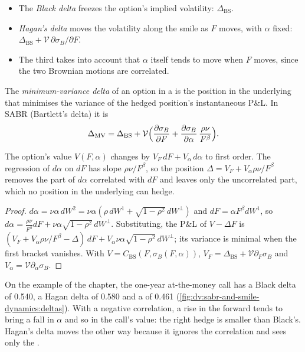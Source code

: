 \begin{itemize}
\item The \emph{Black delta} freezes the option's implied volatility: $\Delta_{\mathrm{BS}}$.
\item \emph{Hagan's delta} moves the volatility along the smile as $F$ moves, with $\alpha$ fixed:
$\Delta_{\mathrm{BS}}+\mathcal V\,\partial\sigma_B/\partial F$.
\item The third takes into account that $\alpha$ itself tends to move when $F$ moves, since the two
Brownian motions are correlated.
\end{itemize}

\begin{definition}\label{def:dv:sabr-and-smile-dynamics:mvdelta}
The \emph{minimum-variance delta} of an option in a 
is the position in the underlying that minimises the variance of the hedged position's instantaneous P\&L.
In SABR (Bartlett's delta) it is
\[
\Delta_{\mathrm{MV}}=\Delta_{\mathrm{BS}}+\mathcal V\Bigl(\frac{\partial\sigma_B}{\partial F}
+\frac{\partial\sigma_B}{\partial\alpha}\,\frac{\rho\nu}{F^{\beta}}\Bigr).
\]
\end{definition}

\begin{proposition}\label{prop:dv:sabr-and-smile-dynamics:mv}
The option's value $V(F,\alpha)$ changes by $V_F\,dF+V_\alpha\,d\alpha$ to first order. The regression of
$d\alpha$ on $dF$ has slope $\rho\nu/F^\beta$, so the position $\Delta=V_F+V_\alpha\rho\nu/F^\beta$ removes
the part of $d\alpha$ correlated with $dF$ and leaves only the uncorrelated part, which no position in the
underlying can hedge.
\end{proposition}
\begin{proof}
$d\alpha=\nu\alpha\,dW^2=\nu\alpha(\rho\,dW^1+\sqrt{1-\rho^2}\,dW^\perp)$ and $dF=\alpha F^\beta dW^1$, so
$d\alpha=\frac{\rho\nu}{F^\beta}dF+\nu\alpha\sqrt{1-\rho^2}\,dW^\perp$. Substituting, the P\&L of
$V-\Delta F$ is $(V_F+V_\alpha\rho\nu/F^\beta-\Delta)\,dF+V_\alpha\nu\alpha\sqrt{1-\rho^2}\,dW^\perp$; its
variance is minimal when the first bracket vanishes. With $V=C_{\mathrm{BS}}(F,\sigma_B(F,\alpha))$,
$V_F=\Delta_{\mathrm{BS}}+\mathcal V\partial_F\sigma_B$ and $V_\alpha=\mathcal V\partial_\alpha\sigma_B$.
\end{proof}

On the example of the chapter, the one-year at-the-money call has a Black delta of 0.540, a Hagan delta of 0.580
and a  of 0.461 (\cref{fig:dv:sabr-and-smile-dynamics:deltas}). With a negative correlation,
a rise in the forward tends to bring a fall in $\alpha$ and so in the call's value: the right hedge is smaller than
Black's. Hagan's delta moves the other way because it ignores the correlation and sees only the .

